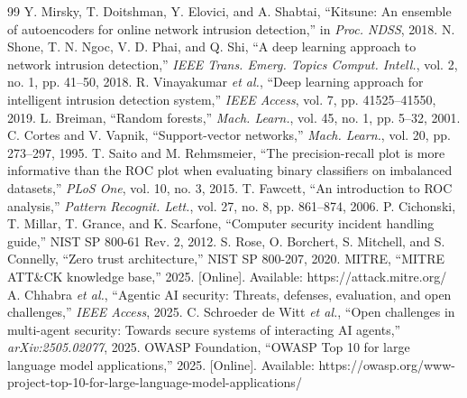 \documentclass[conference]{IEEEtran}
\begin{document}
\begin{thebibliography}{99}
 Y. Mirsky, T. Doitshman, Y. Elovici, and A. Shabtai, ``Kitsune: An ensemble of autoencoders for online network intrusion detection,'' in \textit{Proc. NDSS}, 2018.
 N. Shone, T. N. Ngoc, V. D. Phai, and Q. Shi, ``A deep learning approach to network intrusion detection,'' \textit{IEEE Trans. Emerg. Topics Comput. Intell.}, vol. 2, no. 1, pp. 41--50, 2018.
 R. Vinayakumar \textit{et al.}, ``Deep learning approach for intelligent intrusion detection system,'' \textit{IEEE Access}, vol. 7, pp. 41525--41550, 2019.
 L. Breiman, ``Random forests,'' \textit{Mach. Learn.}, vol. 45, no. 1, pp. 5--32, 2001.
 C. Cortes and V. Vapnik, ``Support-vector networks,'' \textit{Mach. Learn.}, vol. 20, pp. 273--297, 1995.
 T. Saito and M. Rehmsmeier, ``The precision-recall plot is more informative than the ROC plot when evaluating binary classifiers on imbalanced datasets,'' \textit{PLoS One}, vol. 10, no. 3, 2015.
 T. Fawcett, ``An introduction to ROC analysis,'' \textit{Pattern Recognit. Lett.}, vol. 27, no. 8, pp. 861--874, 2006.
 P. Cichonski, T. Millar, T. Grance, and K. Scarfone, ``Computer security incident handling guide,'' NIST SP 800-61 Rev. 2, 2012.
 S. Rose, O. Borchert, S. Mitchell, and S. Connelly, ``Zero trust architecture,'' NIST SP 800-207, 2020.
 MITRE, ``MITRE ATT\&CK knowledge base,'' 2025. [Online]. Available: https://attack.mitre.org/
 A. Chhabra \textit{et al.}, ``Agentic AI security: Threats, defenses, evaluation, and open challenges,'' \textit{IEEE Access}, 2025.
 C. Schroeder de Witt \textit{et al.}, ``Open challenges in multi-agent security: Towards secure systems of interacting AI agents,'' \textit{arXiv:2505.02077}, 2025.
 OWASP Foundation, ``OWASP Top 10 for large language model applications,'' 2025. [Online]. Available: https://owasp.org/www-project-top-10-for-large-language-model-applications/
\end{thebibliography}
\end{document}
